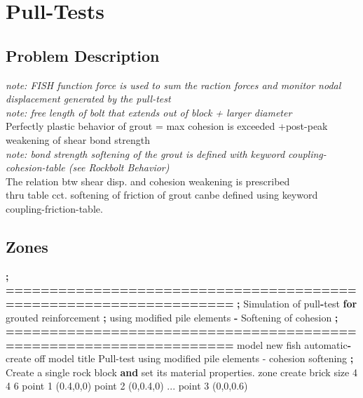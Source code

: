 \documentclass[a4paper, nobind]{templates/ociamthesis}
\newenvironment{Shaded}{\begin{snugshade}}{\end{snugshade}}
\newcommand{\BuiltInTok}[1]{#1}
\newcommand{\ControlFlowTok}[1]{\textcolor[rgb]{0.13,0.29,0.53}{\textbf{#1}}}
\newcommand{\DecValTok}[1]{\textcolor[rgb]{0.00,0.00,0.81}{#1}}
\newcommand{\FloatTok}[1]{\textcolor[rgb]{0.00,0.00,0.81}{#1}}
\newcommand{\KeywordTok}[1]{\textcolor[rgb]{0.13,0.29,0.53}{\textbf{#1}}}
\newcommand{\NormalTok}[1]{#1}
\newcommand{\OperatorTok}[1]{\textcolor[rgb]{0.81,0.36,0.00}{\textbf{#1}}}
\newcommand{\StringTok}[1]{\textcolor[rgb]{0.31,0.60,0.02}{#1}}
\renewenvironment{Shaded}
{
  \vspace{10pt}%
  \begin{snugshade}%
}{%
  \end{snugshade}%
  \vspace{8pt}%
}
\begin{document}
\newpage

\hypertarget{pull-tests}{%
\chapter{Pull-Tests}\label{pull-tests}}

\hypertarget{problem-description-1}{%
\section{Problem Description}\label{problem-description-1}}

\emph{note: FISH function force is used to sum the raction forces and monitor nodal displacement generated by the pull-test}\\
\emph{note: free length of bolt that extends out of block + larger diameter}\\
Perfectly plastic behavior of grout = max cohesion is exceeded +post-peak weakening of shear bond strength\\
\emph{note: bond strength softening of the grout is defined with keyword coupling-cohesion-table (see Rockbolt Behavior)}\\
The relation btw shear disp. and cohesion weakening is prescribed\\
thru table cct. softening of friction of grout canbe defined using keyword coupling-friction-table.\\

\hypertarget{zones-2}{%
\section{Zones}\label{zones-2}}

\begin{Shaded}
\begin{Highlighting}[]
\OperatorTok{;} \OperatorTok{==================================================================}
\OperatorTok{;}\NormalTok{   Simulation of pull}\OperatorTok{{-}}\NormalTok{test }\ControlFlowTok{for}\NormalTok{ grouted reinforcement}
\OperatorTok{;}\NormalTok{   using modified pile elements }\OperatorTok{{-}}\NormalTok{ Softening of cohesion}
\OperatorTok{;} \OperatorTok{==================================================================}
\NormalTok{model new }
\NormalTok{fish automatic}\OperatorTok{{-}}\NormalTok{create off}
\NormalTok{model title }\StringTok{\textquotesingle{}Pull{-}test using modified pile elements {-} cohesion softening\textquotesingle{}}
\OperatorTok{;}\NormalTok{ Create a single rock block }\KeywordTok{and} \BuiltInTok{set}\NormalTok{ its material properties.}
\NormalTok{zone create brick size }\DecValTok{4} \DecValTok{4} \DecValTok{6}\NormalTok{ point }\DecValTok{1}\NormalTok{ (}\FloatTok{0.4}\NormalTok{,}\DecValTok{0}\NormalTok{,}\DecValTok{0}\NormalTok{) point }\DecValTok{2}\NormalTok{ (}\DecValTok{0}\NormalTok{,}\FloatTok{0.4}\NormalTok{,}\DecValTok{0}\NormalTok{) ...}
\NormalTok{                             point }\DecValTok{3}\NormalTok{ (}\DecValTok{0}\NormalTok{,}\DecValTok{0}\NormalTok{,}\FloatTok{0.6}\NormalTok{)}
\end{Highlighting}
\end{Shaded}
\end{document}
